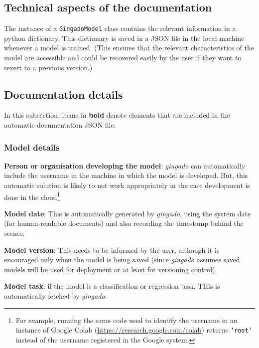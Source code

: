 \documentclass{article}
\begin{document}
\subsection{Technical aspects of the documentation}

The instance of a \texttt{GingadoModel} class contains the relevant information in a python dictionary. This dictionary is saved in a JSON file in the local machine whenever a model is trained. (This ensures that the relevant characteristics of the model are accessible and could be recovered easily by the user if they want to revert to a previous version.)


\subsection{Documentation details}

In this subsection, items in \textbf{bold} denote elements that are included in the automatic documentation JSON file.

\subsubsection{Model details}

\textbf{Person or organisation developing the model}: \textit{gingado} can automatically include the username in the machine in which the model is developed. But, this automatic solution is likely to not work appropriately in the case development is done in the cloud\footnote{For example, running the same code used to identify the username in an instance of Google Colab (\url{https://research.google.com/colab}) returns \texttt{'root'} instead of the username registered in the Google system.}

\textbf{Model date}: This is automatically generated by \textit{gingado}, using the system date (for human-readable documents) and also recording the timestamp behind the scenes.

\textbf{Model version}: This needs to be informed by the user, although it is encouraged only when the model is being saved (since \textit{gingado} assumes saved models will be used for deployment or at least for versioning control).

\textbf{Model task}: if the model is a classification or regression task. THis is automatically fetched by \textit{gingado}.
\end{document}

